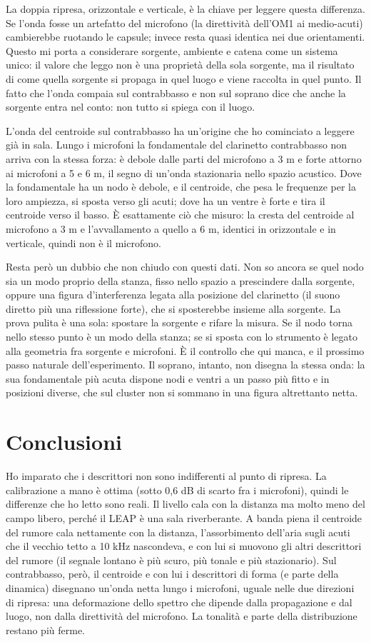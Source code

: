 \documentclass[11pt,a4paper]{article}
\begin{document}
La doppia ripresa, orizzontale e verticale, è la chiave per leggere questa differenza. Se
l'onda fosse un artefatto del microfono (la direttività dell'OM1 ai medio-acuti) cambierebbe
ruotando le capsule; invece resta quasi identica nei due orientamenti. Questo mi porta a
considerare sorgente, ambiente e catena come un sistema unico: il valore che leggo non è una
proprietà della sola sorgente, ma il risultato di come quella sorgente si propaga in quel
luogo e viene raccolta in quel punto. Il fatto che l'onda compaia sul contrabbasso e non sul
soprano dice che anche la sorgente entra nel conto: non tutto si spiega con il luogo.

L'onda del centroide sul contrabbasso ha un'origine che ho cominciato a leggere già in sala.
Lungo i microfoni la fondamentale del clarinetto contrabbasso non arriva con la stessa forza:
è debole dalle parti del microfono a 3 m e forte attorno ai microfoni a 5 e 6 m, il segno di
un'onda stazionaria nello spazio acustico. Dove la fondamentale ha un nodo è debole, e il
centroide, che pesa le frequenze per la loro ampiezza, si sposta verso gli acuti; dove ha un
ventre è forte e tira il centroide verso il basso. È esattamente ciò che misuro: la cresta
del centroide al microfono a 3 m e l'avvallamento a quello a 6 m, identici in orizzontale e
in verticale, quindi non è il microfono.

Resta però un dubbio che non chiudo con questi dati. Non so ancora se quel nodo sia un modo
proprio della stanza, fisso nello spazio a prescindere dalla sorgente, oppure una figura
d'interferenza legata alla posizione del clarinetto (il suono diretto più una riflessione
forte), che si sposterebbe insieme alla sorgente. La prova pulita è una sola: spostare la
sorgente e rifare la misura. Se il nodo torna nello stesso punto è un modo della stanza; se
si sposta con lo strumento è legato alla geometria fra sorgente e microfoni. È il controllo
che qui manca, e il prossimo passo naturale dell'esperimento. Il soprano, intanto, non
disegna la stessa onda: la sua fondamentale più acuta dispone nodi e ventri a un passo più
fitto e in posizioni diverse, che sul cluster non si sommano in una figura altrettanto netta.

\section{Conclusioni}
Ho imparato che i descrittori non sono indifferenti al punto di ripresa. La calibrazione a
mano è ottima (sotto 0,6 dB di scarto fra i microfoni), quindi le differenze che ho letto
sono reali. Il livello cala con la distanza ma molto meno del campo libero, perché il LEAP è
una sala riverberante. A banda piena il centroide del rumore cala nettamente con la distanza,
l'assorbimento dell'aria sugli acuti che il vecchio tetto a 10 kHz nascondeva, e con lui si
muovono gli altri descrittori del rumore (il segnale lontano è più scuro, più tonale e più
stazionario). Sul contrabbasso,
però, il centroide e con lui i descrittori di forma (e parte della dinamica) disegnano
un'onda netta lungo i microfoni, uguale nelle due direzioni di ripresa: una deformazione
dello spettro che dipende dalla propagazione e dal luogo, non dalla direttività del microfono.
La tonalità e parte della distribuzione restano più ferme.
\end{document}
